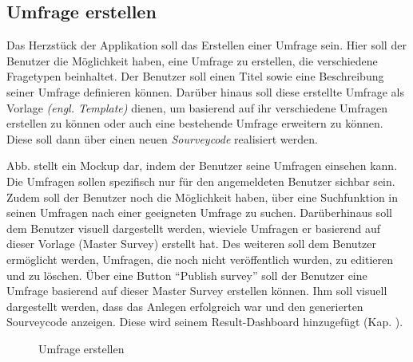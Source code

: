 \subsection{Umfrage erstellen}
\label{ssec:UmfrageErstellen}

Das Herzstück der Applikation soll das Erstellen einer Umfrage sein. 
Hier soll der Benutzer die Möglichkeit haben, eine Umfrage zu erstellen, die verschiedene Fragetypen beinhaltet. 
Der Benutzer soll einen Titel sowie eine Beschreibung seiner Umfrage definieren können. 
Darüber hinaus soll diese erstellte Umfrage als Vorlage \emph{(engl. Template)} dienen, um basierend auf ihr verschiedene Umfragen erstellen zu können oder auch eine bestehende Umfrage erweitern zu können. 
Diese soll dann über einen neuen \emph{Sourveycode} realisiert werden. 

Abb.  stellt ein Mockup dar, indem der Benutzer seine Umfragen einsehen kann. 
Die Umfragen sollen spezifisch nur für den angemeldeten Benutzer sichbar sein. 
Zudem soll der Benutzer noch die Möglichkeit haben, über eine Suchfunktion in seinen Umfragen nach einer geeigneten Umfrage zu suchen. \newline
Darüberhinaus soll dem Benutzer visuell dargestellt werden, wieviele Umfragen er basierend auf dieser Vorlage (Master Survey) erstellt hat. 
Des weiteren soll dem Benutzer ermöglicht werden, Umfragen, die noch nicht veröffentlich wurden, zu editieren und zu löschen. \newline
Über eine Button \enquote{Publish survey} soll der Benutzer eine Umfrage basierend auf dieser Master Survey erstellen können. 
Ihm soll visuell dargestellt werden, dass das Anlegen erfolgreich war und den generierten Sourveycode anzeigen. 
Diese wird seinem Result-Dashboard hinzugefügt (Kap. ). 

\begin{figure}
	\caption[Umfrage erstellen]{Umfrage erstellen \\ \quelle}
	\label{fig:MockUmfrageErstellen}
\end{figure}